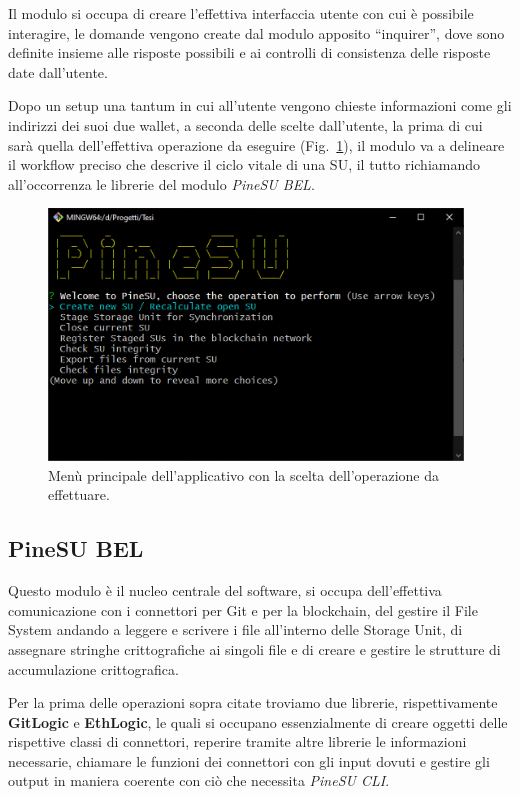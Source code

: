 Il modulo si occupa di creare l’effettiva interfaccia utente con cui è possibile interagire,
le domande vengono create dal modulo apposito “inquirer”, dove sono definite
insieme alle risposte possibili e ai controlli di consistenza delle risposte date dall’utente.

Dopo un setup una tantum in cui all’utente vengono chieste informazioni come gli indirizzi dei
suoi due wallet, a seconda delle scelte dall’utente, la prima di cui sarà quella dell’effettiva
operazione da eseguire (Fig.~\ref{fi:menu}), il modulo va a delineare il workflow preciso che descrive il ciclo vitale
di una SU, il tutto richiamando all’occorrenza le librerie del modulo \emph{PineSU BEL}. 

\begin{figure}[H]
    \centering
    \includegraphics[width=0.98\textwidth]{Figures/menu}
    \caption{\small{
    Menù principale dell’applicativo con la scelta dell’operazione da effettuare.
    } %
    } %
    \label{fi:menu}
\end{figure}

\newpage

\subsection{PineSU BEL}

Questo modulo è il nucleo centrale del software, si occupa dell’effettiva comunicazione con i connettori per Git e per la blockchain, del gestire il File System andando a leggere e scrivere i file all’interno delle Storage Unit, di assegnare stringhe crittografiche ai singoli file e di creare e gestire le strutture di accumulazione crittografica.

Per la prima delle operazioni sopra citate troviamo due librerie, rispettivamente \textbf{GitLogic} e \textbf{EthLogic}, le quali si occupano essenzialmente di creare oggetti delle rispettive classi di connettori, reperire tramite altre librerie le informazioni necessarie, chiamare le funzioni dei connettori con gli input dovuti e gestire gli output in maniera coerente con ciò che necessita \emph{PineSU CLI}.

